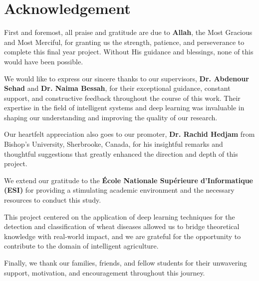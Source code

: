 

\cleardoublepage
{}              %
\chapter*{\Huge\bfseries Acknowledgement}
\thispagestyle{noheader}


\vspace{1cm}

First and foremost, all praise and gratitude are due to \textbf{Allah}, the Most Gracious and Most Merciful, for granting us the strength, patience, and perseverance to complete this final year project. Without His guidance and blessings, none of this would have been possible.

We would like to express our sincere thanks to our supervisors, \textbf{Dr. Abdenour Sehad} and \textbf{Dr. Naima Bessah}, for their exceptional guidance, constant support, and constructive feedback throughout the course of this work. Their expertise in the field of intelligent systems and deep learning was invaluable in shaping our understanding and improving the quality of our research.

Our heartfelt appreciation also goes to our promoter, \textbf{Dr. Rachid Hedjam} from Bishop's University, Sherbrooke, Canada, for his insightful remarks and thoughtful suggestions that greatly enhanced the direction and depth of this project.

We extend our gratitude to the \textbf{École Nationale Supérieure d’Informatique (ESI)} for providing a stimulating academic environment and the necessary resources to conduct this study.

This project centered on the application of deep learning techniques for the detection and classification of wheat diseases allowed us to bridge theoretical knowledge with real-world impact, and we are grateful for the opportunity to contribute to the domain of intelligent agriculture.

Finally, we thank our families, friends, and fellow students for their unwavering support, motivation, and encouragement throughout this journey.
